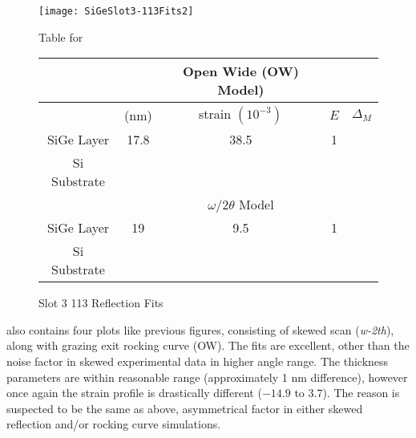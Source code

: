 \begin{figure}[hc]%
\caption{Slot 3 113 Reflection Fits}
\label{Slot3-113}
\begin{minipage}{0.85\linewidth}
\texttt{[image: SiGeSlot3-113Fits2]}
\end{minipage}
\begin{minipage}{\linewidth}
\centering
\vspace{10pt}
Table for \\
\vspace{5pt}
\begin{tabular}{c|cccc}
\hline
			& 	&Open Wide (OW) Model)	 \\
\hline
			&	(nm)	&	strain	 $(10^{-3})$&	$E$ &  $\Delta_M$\\
\hline
SiGe Layer		&  	17.8	&     38.5	 & 1 & \textendash	\\
Si Substrate		&	\textemdash & \textemdash&\textemdash\ &\textemdash	\\
\hline
			& &$\omega/2\theta$ Model \\
\hline
SiGe Layer		&	19	& 9.5	&1	& \textendash\ 	\\
Si Substrate		&	\textemdash & \textemdash&\textemdash\ &\textemdash
\end{tabular}
\end{minipage}
\end{figure}

 also contains four plots like previous figures, consisting of skewed scan (\emph{w-2th}), along with grazing exit rocking curve (OW).  The fits are excellent, other than the noise factor in skewed experimental data in higher angle range.  The thickness parameters are within reasonable range (approximately 1 nm difference), however once again the strain profile is drastically different ($-14.9$ to $3.7$).  The reason is suspected to be the same as above, asymmetrical factor in either skewed reflection and/or rocking curve simulations.  


